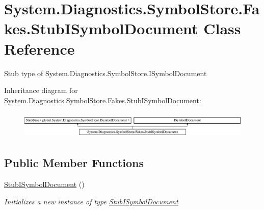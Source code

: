 \hypertarget{class_system_1_1_diagnostics_1_1_symbol_store_1_1_fakes_1_1_stub_i_symbol_document}{\section{System.\-Diagnostics.\-Symbol\-Store.\-Fakes.\-Stub\-I\-Symbol\-Document Class Reference}
\label{class_system_1_1_diagnostics_1_1_symbol_store_1_1_fakes_1_1_stub_i_symbol_document}
}


Stub type of System.\-Diagnostics.\-Symbol\-Store.\-I\-Symbol\-Document 


Inheritance diagram for System.\-Diagnostics.\-Symbol\-Store.\-Fakes.\-Stub\-I\-Symbol\-Document\-:\begin{figure}[H]
\begin{center}
\leavevmode
\includegraphics[height=1.323877cm]{class_system_1_1_diagnostics_1_1_symbol_store_1_1_fakes_1_1_stub_i_symbol_document}
\end{center}
\end{figure}
\subsection*{Public Member Functions}
\begin{DoxyCompactItemize}
\item 
\hyperlink{class_system_1_1_diagnostics_1_1_symbol_store_1_1_fakes_1_1_stub_i_symbol_document_aa1b58f49565ae23dcc5310c9de0c59f7}{Stub\-I\-Symbol\-Document} ()
\begin{DoxyCompactList}\small\item\em Initializes a new instance of type \hyperlink{class_system_1_1_diagnostics_1_1_symbol_store_1_1_fakes_1_1_stub_i_symbol_document}{Stub\-I\-Symbol\-Document}\end{DoxyCompactList}\end{DoxyCompactItemize}
